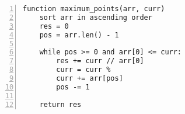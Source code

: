 \begin{figure*}
\centering
\begin{lstlisting}[breaklines=true, frame=shadowbox, numbers=left,]
function maximum_points(arr, curr)
    sort arr in ascending order
    res = 0
    pos = arr.len() - 1

    while pos >= 0 and arr[0] <= curr:
        res += curr // arr[0]
        curr = curr %
        curr += arr[pos]
        pos -= 1

    return res
\end{lstlisting}
\label{lst:pseudo-rust-underflow}
\end{figure*}

